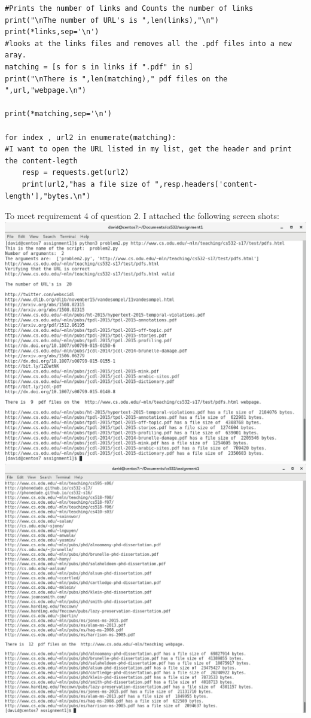 \documentclass[10pt,letterpaper]{article}
\begin{document}
\cite{stackoverflow}
\begin{lstlisting}
#Prints the number of links and Counts the number of links
print("\nThe number of URL's is ",len(links),"\n")  
print(*links,sep='\n')
#looks at the links files and removes all the .pdf files into a new aray.
matching = [s for s in links if ".pdf" in s]
print("\nThere is ",len(matching)," pdf files on the ",url,"webpage.\n")

print(*matching,sep='\n')

for index , url2 in enumerate(matching):
#I want to open the URL listed in my list, get the header and print the content-legth
	resp = requests.get(url2)
	print(url2,"has a file size of ",resp.headers['content-length'],"bytes.\n")
\end{lstlisting}
To meet requirement 4 of question 2. I attached the following screen shots:\\
\includegraphics[scale=.25]{problem2req4a.png}
\includegraphics[scale=.25]{problem2req4c.png}
\end{document}
